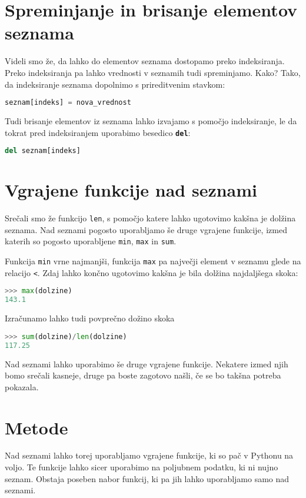 \section{Spreminjanje in brisanje elementov seznama}

Videli smo že, da lahko do elementov seznama dostopamo preko indeksiranja. Preko indeksiranja pa lahko vrednosti v seznamih tudi spreminjamo. Kako? Tako, da indeksiranje seznama dopolnimo s prireditvenim stavkom:
\begin{lstlisting}[language=Python]
seznam[indeks] = nova_vrednost
\end{lstlisting}

Tudi brisanje elementov iz seznama lahko izvajamo s pomočjo indeksiranje, le da tokrat pred indeksiranjem uporabimo besedico \textbf{\texttt{del}}:
\begin{lstlisting}[language=Python]
del seznam[indeks]
\end{lstlisting}

\section{Vgrajene funkcije nad seznami}
Srečali smo že funkcijo \texttt{len}, s pomočjo katere lahko ugotovimo kakšna je dolžina seznama. Nad seznami pogosto uporabljamo še druge vgrajene funkcije, izmed katerih so pogosto uporabljene \texttt{min}, \texttt{max} in \texttt{sum}.

Funkcija \texttt{min} vrne najmanjši, funkcija \texttt{max} pa največji element v seznamu glede na relacijo \texttt{<}. Zdaj lahko končno ugotovimo kakšna je bila dolžina najdaljšega skoka:
\begin{lstlisting}[language=Python]
>>> max(dolzine)
143.1
\end{lstlisting}

Izračunamo lahko tudi povprečno dožino skoka
\begin{lstlisting}[language=Python]
>>> sum(dolzine)/len(dolzine)
117.25
\end{lstlisting}
Nad seznami lahko uporabimo še druge vgrajene funkcije. Nekatere izmed njih bomo srečali kasneje, druge pa boste zagotovo našli, če se bo takšna potreba pokazala. 

\section{Metode}

Nad seznami lahko torej uporabljamo vgrajene funkcije, ki so pač v Pythonu na voljo. Te funkcije lahko sicer uporabimo na poljubnem podatku, ki ni nujno seznam. Obstaja poseben nabor funkcij, ki pa jih lahko uporabljamo samo nad seznami. 

